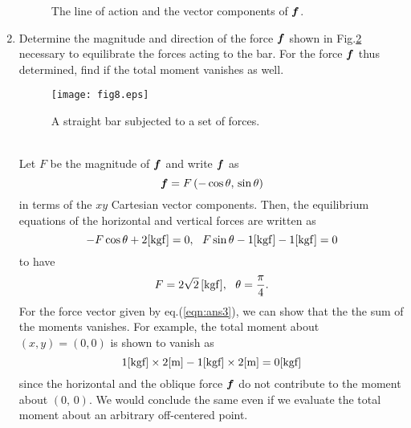 \documentclass[10pt,a4j]{article}
\begin{document}
\begin{enumerate}
{\begin{figure}[h]
			\caption{The line of action and the vector components of $\mbox{\boldmath $f$}$.} 
		\label{fig:fig6_1}
		\end{figure}
	}
\item
	Determine the magnitude and direction of the force $\mbox{\boldmath $f$}$ shown in 
	Fig.\ref{fig:fig8} necessary to equilibrate the forces acting to the bar.
	For the force $\mbox{\boldmath $f$}$ thus determined, find if the total moment vanishes as well.
	\begin{figure}[h]
		\begin{center}
		\texttt{[image: fig8.eps]} 
		\end{center}
		\caption{A straight bar subjected to a set of forces.} 
		\label{fig:fig8}
	\end{figure}
	\\

	{\small
		Let $F$ be the magnitude of $\mbox{\boldmath $f$}$ and write $\mbox{\boldmath $f$}$ as 
		\[
			\mbox{\boldmath $f$}=F \left( -\cos\theta,\, \sin\theta \right)
		\]
		in terms of the $xy$ Cartesian vector components. 
		Then, the equilibrium equations of the horizontal and vertical 
		forces are written as 
		\[
			-F\cos\theta + 2[{\rm kgf}]=0, \ \ 
			F\sin\theta -1[{\rm kgf}]-1[{\rm kgf}]=0
		\]
		to have 
		\begin{equation}
			F=2\sqrt{2} \,[{\rm kgf}], \ \ \theta=\frac{\pi}{4}.
			\label{eqn:ans3}
		\end{equation}
		For the force vector given by eq.(\ref{eqn:ans3}), we can show that the 
		the sum of the moments vanishes.
		For example, the total moment about $(x,y)=(0,0)$ is shown to vanish as  
		\[
			{\rm 1[kgf] \times 2[m] -1[kgf] \times 2[m]=0 [kgf] }
		\]
		since the horizontal and the oblique force $\mbox{\boldmath $f$}$ do not 
		contribute to the moment about $(0,\, 0)$. 
		We would conclude the same even if we evaluate the total moment 
		about an arbitrary off-centered point.
	}

\end{enumerate}
\end{document}

